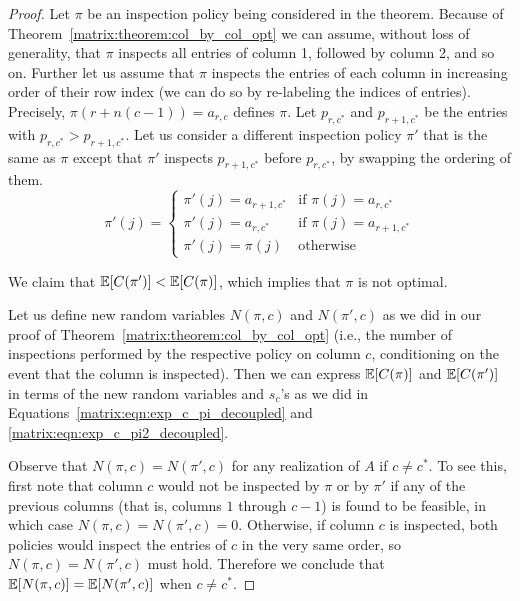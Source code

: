  \begin{proof}
 	Let $\pi$ be an inspection policy being considered in the theorem.
 	Because of Theorem~\ref{matrix:theorem:col_by_col_opt} we can assume, without loss of generality, that $\pi$ inspects all entries of column 1, followed by column 2, and so on.
 	Further let us assume that $\pi$ inspects the entries of each column in increasing order of their row index (we can do so by re-labeling the indices of entries). Precisely, $\pi(r + n (c-1)) = a_{r,c}$ defines $\pi$. Let $p_{r,c^*}$ and $p_{r+1,c^*}$ be the entries with $p_{r,c^*} > p_{r+1, c^*}$.
 	Let us consider a different inspection policy $\pi'$ that is the same as $\pi$ except that $\pi'$ inspects $p_{r+1,c^*}$ before $p_{r,c^*}$, by swapping the ordering of them.
 	\begin{equation*}
 		\pi'(j) = 
 		\begin{cases}
 			\pi'(j) = a_{r+1,c^*}  &  \mbox{if~} \pi(j) = a_{r,c^*} \\
 			\pi'(j) = a_{r,c^*}    &  \mbox{if~} \pi(j) = a_{r+1,c^*} \\
 			\pi'(j) = \pi(j)     &  \mbox{otherwise} 
 		\end{cases}
 	\end{equation*}	
	
 	We claim that $\mathbb{E}[C(\pi')] < \mathbb{E}[C(\pi)]$, which implies that $\pi$ is not optimal.
	
 	Let us define new random variables $N(\pi, c)$ and $N(\pi', c)$ as we did in our proof of Theorem~\ref{matrix:theorem:col_by_col_opt} (i.e., the number of inspections performed by the respective policy on column $c$, conditioning on the event that the column is inspected).
 	Then we can express $\mathbb{E}[C(\pi)]$ and $\mathbb{E}[C(\pi')]$ in terms of the new random variables and $s_c$'s as we did in Equations~\ref{matrix:eqn:exp_c_pi_decoupled} and \ref{matrix:eqn:exp_c_pi2_decoupled}.
	
 	Observe that $N(\pi, c) = N(\pi', c)$ for any realization of $A$ if $c \neq c^*$.
 	To see this, first note that column $c$ would not be inspected by $\pi$ or by $\pi'$ if any of the previous columns (that is, columns $1$ through $c-1$) is found to be feasible, in which case $N(\pi, c) = N(\pi', c) = 0$. Otherwise, if column $c$ is inspected, both policies would inspect the entries of $c$ in the very same order, so $N(\pi, c) = N(\pi', c)$ must hold. Therefore we conclude that $\mathbb{E}[N(\pi, c)] = \mathbb{E}[N(\pi', c)]$ when $c \neq c^*$. 
	

\end{proof}

